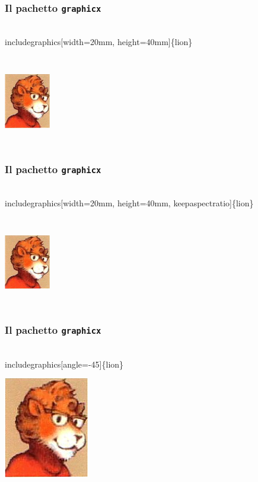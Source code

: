 \documentclass[svgnames,%
	ucs,%
	pdftex]{guitbeamer}
\begin{document}
\begin{frame}
  \frametitle{Il pachetto \texttt{graphicx}}
	\begin{LaTeXcode}
		\\includegraphics\alert{[width=20mm, height=40mm]}\{lion\}
	\end{LaTeXcode}
	\begin{center}
		\includegraphics[width=20mm, height=40mm]{lion}
	\end{center}
\end{frame}
\begin{frame}
  \frametitle{Il pachetto \texttt{graphicx}}
	\begin{LaTeXcode}
		\\includegraphics\alert{[width=20mm, height=40mm,}\n
		\alert{keepaspectratio]}\{lion\}
	\end{LaTeXcode}
	\begin{center}
		\includegraphics[width=20mm, height=40mm, keepaspectratio]{lion}
	\end{center}
\end{frame}
\begin{frame}
  \frametitle{Il pachetto \texttt{graphicx}}
	\begin{LaTeXcode}
		\\includegraphics\alert{[angle=-45]}\{lion\}
	\end{LaTeXcode}
	\begin{center}
		\includegraphics[angle=-45]{lion}
	\end{center}
\end{frame}
\end{document}
